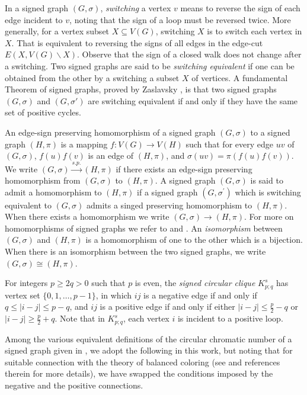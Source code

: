 \documentclass[11pt,a4paper]{article}
\theoremstyle{definition}
\begin{document}
	In a signed graph $(G, \sigma)$, \emph{switching} a vertex $v$ means to reverse the sign of each edge incident to $v$, noting that the sign of a loop must be reversed twice. More generally, for a vertex subset $X \subseteq V(G)$, switching $X$ is to switch each vertex in $X$. That is equivalent to reversing the signs of all edges in the edge-cut $E(X, V(G) \backslash X)$. Observe that the sign of a closed walk does not change after a switching. 
	Two signed graphs are said to be \emph{switching equivalent} if one can be obtained from the other by a switching a subset $X$ of vertices. A fundamental Theorem of signed graphs, proved by Zaslavsky \cite{zaslavsky82}, is that two signed graphs $(G, \sigma)$ and $(G, \sigma')$ are switching equivalent if and only if they have the same set of positive cycles. 	
	
	An edge-sign preserving homomorphism of a signed graph $(G, \sigma)$ to a signed graph $(H, \pi)$ is a mapping $f: V(G) \rightarrow V(H)$ such that for every edge $uv$ of $(G, \sigma)$, $f(u)f(v)$ is an edge of $(H, \pi)$, and $\sigma(uv)=\pi(f(u)f(v))$. We  write $(G, \sigma) \xrightarrow{s. p.}(H, \pi)$ if there exists an edge-sign preserving homomorphism from $(G, \sigma)$ to $(H, \pi)$. 
	A signed graph $(G, \sigma)$ is said to admit a homomorphism to $(H,\pi)$ if a signed graph $\left(G, \sigma^{\prime}\right)$ which is switching equivalent to $(G, \sigma)$ admits a singed preserving homomorphism to $(H, \pi)$. When there exists a homomorphism we write $(G, \sigma) \rightarrow (H, \pi)$. For more on homomorphisms of signed graphs we refer to \cite{NRS15} and \cite{NSZ21}. An \emph{isomorphism} between $(G, \sigma)$ and $(H, \pi)$ is a homomorphism of one to the other which is a bijection. When there is an isomorphism between the two signed graphs, we write $(G, \sigma) \cong (H, \pi)$.
	
	
	
	For integers $p \geqslant 2 q>0$ such that $p$ is even, the \emph{signed circular clique} $K_{p ; q}^s$ has vertex set $\{0,1, \ldots, p-1\}$, in which $ij$ is a negative edge if and only if $q \leqslant|i-j| \leqslant p-q$, and $ij$ is a positive edge if and only if either $|i-j| \leqslant \frac{p}{2}-q$ or $|i-j| \geqslant \frac{p}{2}+q$. Note that in $K_{p ; q}^s$, each vertex $i$ is incident to a positive loop.  
	
	Among the various equivalent definitions of the circular chromatic number of a signed graph given in \cite{NWZ21}, we adopt the following in this work, but noting that for suitable connection with the theory of balanced coloring (see \cite{JMNNQ25} and references therein for more details), we have swapped the conditions imposed by the negative and the positive connections.
	
\end{document}
